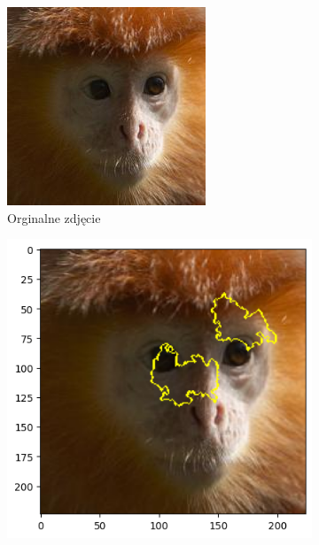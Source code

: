 \begin{figure}[h]
	\centering
	\begin{subfigure}[b]{0.3\textwidth}
		\includegraphics[width=.9\textwidth]{img/examples/appendix/n02488291_05090}
		\caption{Orginalne zdjęcie}  \label{}
	\end{subfigure}
	\begin{subfigure}[b]{0.3\textwidth}
		\centering\includegraphics[width=.9\textwidth]{img/examples/appendix/n02488291_05090_lime}

\end{subfigure}
\end{figure}
